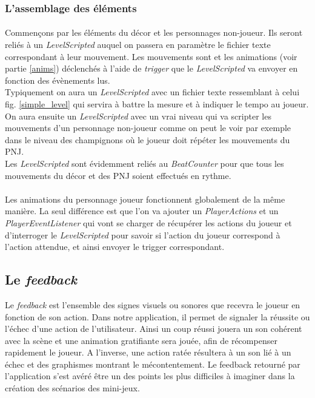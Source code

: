 \subsubsection{L'assemblage des éléments}

\paragraph{}
Commençons par les éléments du décor et les personnages non-joueur. Ils seront reliés à un \textit{LevelScripted} auquel on passera en paramètre le fichier texte correspondant à leur mouvement. Les mouvements sont et les animations (voir partie \ref{anims}) déclenchés à l'aide de \textit{trigger} que le \textit{LevelScripted} va envoyer en fonction des évènements lus. \\
Typiquement on aura un \textit{LevelScripted} avec un fichier texte ressemblant à celui fig. \ref{simple_level} qui servira à battre la mesure et à indiquer le tempo au joueur.\\
On aura ensuite un \textit{LevelScripted} avec un vrai niveau qui va scripter les mouvements d'un personnage non-joueur comme on peut le voir par exemple dans le niveau des champignons où le joueur doit répéter les mouvements du PNJ.\\
Les \textit{LevelScripted} sont évidemment reliés au \textit{BeatCounter} pour que tous les mouvements du décor et des PNJ soient effectués en rythme.

\paragraph{}
Les animations du personnage joueur fonctionnent globalement de la même manière. La seul différence est que l'on va ajouter un \textit{PlayerActions} et un \textit{PlayerEventListener} qui vont se charger de récupérer les actions du joueur et d'interroger le \textit{LevelScripted} pour savoir si l'action du joueur correspond à l'action attendue, et ainsi envoyer le trigger correspondant. 

\subsection{Le \textit{feedback}}

Le \textit{feedback} est l'ensemble des signes visuels ou sonores que recevra le joueur en fonction de son action. Dans notre application, il permet de signaler la réussite ou l'échec d'une action de l'utilisateur. Ainsi un coup réussi jouera un son cohérent avec la scène et une animation gratifiante sera jouée, afin de récompenser rapidement le joueur. A l'inverse, une action ratée résultera à un son lié à un échec et des graphismes montrant le mécontentement.
Le feedback retourné par l'application s'est avéré être un des points les plus difficiles à imaginer dans la création des scénarios des mini-jeux.

